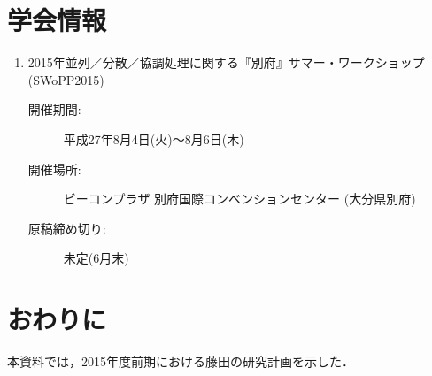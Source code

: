 \documentclass[12pt]{jsarticle}
\begin{document}
\section{学会情報}
\begin{enumerate}
    \item 2015年並列／分散／協調処理に関する『別府』サマー・ワークショップ (SWoPP2015)
        \begin{description}
            \item[開催期間:]平成27年8月4日(火)〜8月6日(木)
            \item[開催場所:] ビーコンプラザ 別府国際コンベンションセンター (大分県別府) 
            \item[原稿締め切り:]未定(6月末)
        \end{description}

\end{enumerate}
\section{おわりに}
本資料では，2015年度前期における藤田の研究計画を示した．
\end{document}
